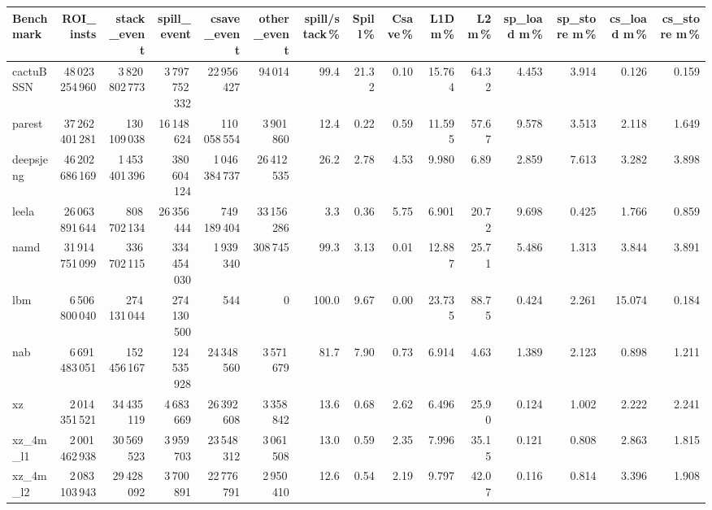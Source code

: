 \documentclass[9pt,landscape,a4paper]{article}
\begin{document}
\vspace{2mm}
\centering
\begin{adjustbox}{max width=\textwidth, max totalheight=0.50\textheight}%
\begin{tabular}{lrrrrrrrrrrrrrr}
\toprule
Benchmark & ROI\_insts & stack\_event & \textbf{spill\_event} & csave\_event & other\_event & spill/stack\,\% & Spill\,\% & Csave\,\% & L1D m\,\% & L2 m\,\% & sp\_load m\,\% & sp\_store m\,\% & cs\_load m\,\% & cs\_store m\,\% \\
\midrule
cactuBSSN & 48\,023\,254\,960 & 3\,820\,802\,773 & 3\,797\,752\,332 & 22\,956\,427 & 94\,014 & 99.4 & 21.32 & 0.10 & 15.764 & 64.32 & 4.453 & 3.914 & 0.126 & 0.159 \\
parest & 37\,262\,401\,281 & 130\,109\,038 & 16\,148\,624 & 110\,058\,554 & 3\,901\,860 & 12.4 & 0.22 & 0.59 & 11.595 & 57.67 & 9.578 & 3.513 & 2.118 & 1.649 \\
deepsjeng & 46\,202\,686\,169 & 1\,453\,401\,396 & 380\,604\,124 & 1\,046\,384\,737 & 26\,412\,535 & 26.2 & 2.78 & 4.53 & 9.980 & 6.89 & 2.859 & 7.613 & 3.282 & 3.898 \\
leela & 26\,063\,891\,644 & 808\,702\,134 & 26\,356\,444 & 749\,189\,404 & 33\,156\,286 & 3.3 & 0.36 & 5.75 & 6.901 & 20.72 & 9.698 & 0.425 & 1.766 & 0.859 \\
namd & 31\,914\,751\,099 & 336\,702\,115 & 334\,454\,030 & 1\,939\,340 & 308\,745 & 99.3 & 3.13 & 0.01 & 12.887 & 25.71 & 5.486 & 1.313 & 3.844 & 3.891 \\
lbm & 6\,506\,800\,040 & 274\,131\,044 & 274\,130\,500 & 544 & 0 & 100.0 & 9.67 & 0.00 & 23.735 & 88.75 & 0.424 & 2.261 & 15.074 & 0.184 \\
nab & 6\,691\,483\,051 & 152\,456\,167 & 124\,535\,928 & 24\,348\,560 & 3\,571\,679 & 81.7 & 7.90 & 0.73 & 6.914 & 4.63 & 1.389 & 2.123 & 0.898 & 1.211 \\
xz & 2\,014\,351\,521 & 34\,435\,119 & 4\,683\,669 & 26\,392\,608 & 3\,358\,842 & 13.6 & 0.68 & 2.62 & 6.496 & 25.90 & 0.124 & 1.002 & 2.222 & 2.241 \\
xz\_4m\_l1 & 2\,001\,462\,938 & 30\,569\,523 & 3\,959\,703 & 23\,548\,312 & 3\,061\,508 & 13.0 & 0.59 & 2.35 & 7.996 & 35.15 & 0.121 & 0.808 & 2.863 & 1.815 \\
xz\_4m\_l2 & 2\,083\,103\,943 & 29\,428\,092 & 3\,700\,891 & 22\,776\,791 & 2\,950\,410 & 12.6 & 0.54 & 2.19 & 9.797 & 42.07 & 0.116 & 0.814 & 3.396 & 1.908 \\

\end{tabular}
\end{adjustbox}
\end{document}
